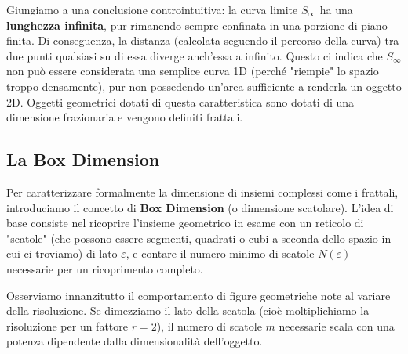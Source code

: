 \documentclass[openany]{book}
\theoremstyle{definition}
\theoremstyle{remark}
\begin{document}
Giungiamo a una conclusione controintuitiva: la curva limite $S_\infty$ ha una \textbf{lunghezza infinita}, pur rimanendo sempre confinata in una porzione di piano finita. Di conseguenza, la distanza (calcolata seguendo il percorso della curva) tra due punti qualsiasi su di essa diverge anch'essa a infinito.
Questo ci indica che $S_\infty$ non può essere considerata una semplice curva 1D (perché "riempie" lo spazio troppo densamente), pur non possedendo un'area sufficiente a renderla un oggetto 2D. Oggetti geometrici dotati di questa caratteristica sono dotati di una dimensione frazionaria e vengono definiti frattali.

\subsection*{La Box Dimension}
Per caratterizzare formalmente la dimensione di insiemi complessi come i frattali, introduciamo il concetto di \textbf{Box Dimension} (o dimensione scatolare). L'idea di base consiste nel ricoprire l'insieme geometrico in esame con un reticolo di "scatole" (che possono essere segmenti, quadrati o cubi a seconda dello spazio in cui ci troviamo) di lato $\varepsilon$, e contare il numero minimo di scatole $N(\varepsilon)$ necessarie per un ricoprimento completo.

Osserviamo innanzitutto il comportamento di figure geometriche note al variare della risoluzione. Se dimezziamo il lato della scatola (cioè moltiplichiamo la risoluzione per un fattore $r=2$), il numero di scatole $m$ necessarie scala con una potenza dipendente dalla dimensionalità dell'oggetto.

\begin{center}
\end{center}
\end{document}
